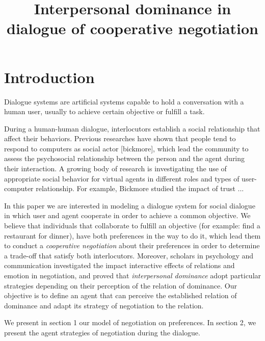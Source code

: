 \documentclass{llncs}
\begin{document}
\title{ Interpersonal dominance in dialogue of cooperative negotiation}
\maketitle 
\section{Introduction}
Dialogue systems are artificial systems capable to hold a conversation with a human user, usually to achieve certain objective or fulfill a task.

During a human-human dialogue, interlocutors establish a social relationship that affect their behaviors. Previous researches have shown that people tend to respond to computers as social actor [bickmore], which lead the community to assess the psychosocial relationship between the person and the agent during their interaction. 
A growing body of research is investigating the use of appropriate social behavior for virtual agents in different roles and types of user-computer relationship.
For example, Bickmore studied the impact of trust ...


In this paper we are interested in modeling a dialogue system for social dialogue in which user and agent cooperate in order to achieve a common objective.  We believe that individuals that collaborate to fulfill an objective (for example: find a restaurant for dinner), have both preferences in the way to do it, which lead them to conduct a \emph{cooperative negotiation} about their preferences in order to determine a trade-off that satisfy both interlocutors. Moreover, scholars in psychology and communication investigated the impact interactive effects of relations and emotion in negotiation, and proved that  \emph{interpersonal dominance} adopt particular strategies depending on their perception of the relation of dominance. Our objective is to define an agent that can perceive the established relation of dominance and adapt its strategy of negotiation to the relation. 
 
We present in section 1 our model of negotiation on preferences. In section 2, we present the agent strategies of negotiation during the dialogue. 
%
\end{document}
